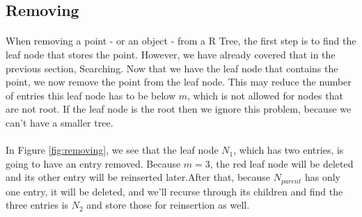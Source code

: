 \documentclass{article}
\begin{document}
\begin{multicols}{2}[]
\section{Removing}

\paragraph{}
When removing a point - or an object - from a R Tree, the first step is to find the leaf node that stores the point.
However, we have already covered that in the previous section, Searching. Now that we have the leaf node that contains
the point, we now remove the point from the leaf node. This may reduce the number of entries this leaf node has to be below
$m$, which is not allowed for nodes that are not root. If the leaf node is the root then we ignore this problem, because
we can't have a smaller tree.\\

\begin{minipage}{\linewidth}
\centering
{}
\label{fig:removing}
\end{minipage}

\paragraph{}
In Figure \ref{fig:removing}, we see that the leaf node $N_1$, which has two entries, is going to have an entry removed.
 Because $m=3$, the red leaf node will be deleted and its other entry will be reinserted later.After that, because $N_{parent}$
 has only one entry, it will be deleted, and we'll recurse through its children and find the three entries is $N_2$ and store those for reinsertion as well.

\end{multicols}
\end{document}
